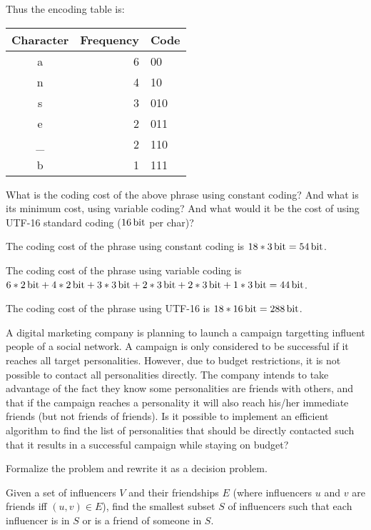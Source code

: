 {Thus the encoding table is:

\begin{center} \begin{tabular}{c | r l}
    \textbf{Character} & \textbf{Frequency} & \textbf{Code} \\ \hline
    a  & 6 & 00 \\
    n  & 4 & 10 \\
    s  & 3 & 010 \\
    e  & 2 & 011 \\
    \_ & 2 & 110 \\
    b  & 1 & 111
\end{tabular} \end{center}

What is the coding cost of the above phrase using constant coding? And what is its minimum cost, using variable coding? And what would it be the cost of using UTF-16 standard coding ($\SI{16}{\bit}$ per char)?

\ansseparator

The coding cost of the phrase using constant coding is $18*\SI{3}{\bit}=\SI{54}{\bit}$.

The coding cost of the phrase using variable coding is $6*\SI{2}{\bit}+4*\SI{2}{\bit}+3*\SI{3}{\bit}+2*\SI{3}{\bit}+2*\SI{3}{\bit}+1*\SI{3}{\bit} = \SI{44}{\bit}$.

The coding cost of the phrase using UTF-16 is $18*\SI{16}{\bit}=\SI{288}{\bit}$.

A digital marketing company is planning to launch a campaign targetting influent people of a social network. A campaign is only considered to be successful if it reaches all target personalities. However, due to budget restrictions, it is not possible to contact all personalities directly. The company intends to take advantage of the fact they know some personalities are friends with others, and that if the campaign reaches a personality it will also reach his/her immediate friends (but not friends of friends). Is it possible to implement an efficient algorithm to find the list of personalities that should be directly contacted such that it results in a successful campaign while staying on budget?

Formalize the problem and rewrite it as a decision problem.

\ansseparator

Given a set of influencers $V$ and their friendships $E$ (where influencers $u$ and $v$ are friends iff $(u,v) \in E$), find the smallest subset $S$ of influencers such that each influencer is in $S$ or is a friend of someone in $S$.

}

